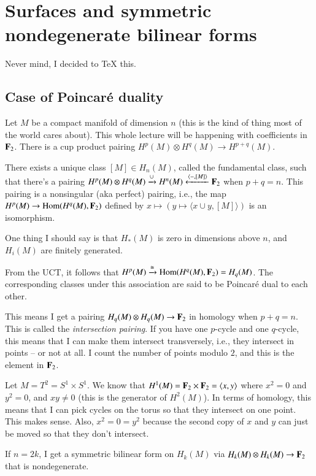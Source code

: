 \section{Surfaces and symmetric nondegenerate bilinear forms}
Never mind, I decided to TeX this.
\subsection{Case of Poincar\'{e} duality}
Let $M$ be a compact manifold of dimension $n$ (this is the kind of thing most of the world cares about). This whole lecture will be happening with coefficients in $\mathbf F_2$. There is a cup product pairing $ H^p(M)\otimes H^q(M)\to H^{p+q}(M)$.
\begin{theorem}
There exists a unique class $[M]\in H_n(M)$, called the fundamental class, such that there's a pairing $ H^p(M)\otimes H^q(M)\xrightarrow{\cup} H^n(M)\xleftarrow{\langle -,[M]\rangle}\mathbf F_2$ when $p+q=n$. This pairing is a nonsingular (aka perfect) pairing, i.e., the map $ H^p(M)\to\operatorname{Hom}( H^q(M),\mathbf F_2)$ defined by $x\mapsto(y\mapsto\langle x\cup y,[M]\rangle)$ is an isomorphism.
\end{theorem}
One thing I should say is that $ H_\ast(M)$ is zero in dimensions above $n$, and $ H_i(M)$ are finitely generated.
\begin{corollary}
From the UCT, it follows that $ H^p(M)\xrightarrow{\cong}\operatorname{Hom}( H^q(M),\mathbf F_2)= H_q(M)$. The corresponding classes under this association are said to be Poincar\'{e} dual to each other.
\end{corollary}
\begin{remark}
This means I get a pairing $ H_q(M)\otimes H_q(M)\to \mathbf F_2$ in homology when $p+q=n$. This is called the \emph{intersection pairing}. If you have one $p$-cycle and one $q$-cycle, this means that I can make them intersect transversely, i.e., they intersect in points -- or not at all. I count the number of points modulo $2$, and this is the element in $\mathbf F_2$.
\end{remark}
\begin{example}
Let $M=T^2=S^1\times S^1$. We know that $ H^1(M)=\mathbf F_2\times\mathbf F_2=\langle x,y\rangle$ where $x^2=0$ and $y^2=0$, and $xy\neq 0$ (this is the generator of $ H^2(M)$). In terms of homology, this means that I can pick cycles on the torus so that they intersect on one point. This makes sense. Also, $x^2=0=y^2$ because the second copy of $x$ and $y$ can just be moved so that they don't intersect.
\end{example}
\begin{example}
If $n=2k$, I get a symmetric bilinear form on $ H_k(M)$ via $ H_k(M)\otimes H_k(M)\to \mathbf F_2$ that is nondegenerate.
\end{example}
